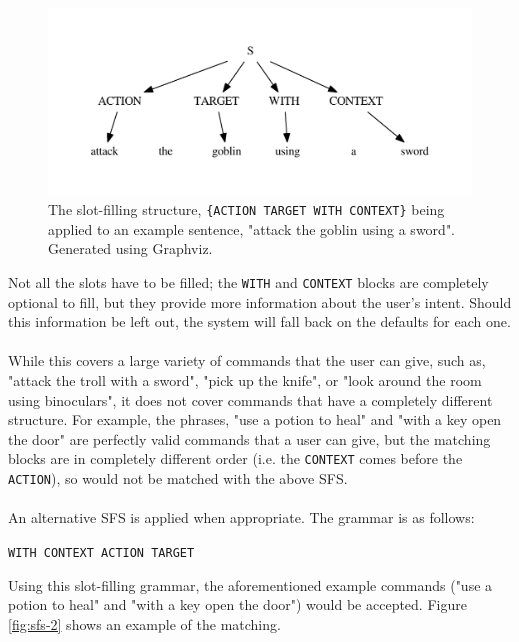 \documentclass[12pt]{article}
\begin{document}
\begin{center}
\begin{figure}[H]
\begin{center}
  \includegraphics[width=\linewidth]{sfs-1.pdf}
  \caption{The slot-filling structure, \texttt{\{ACTION TARGET WITH CONTEXT\}} being applied to an example sentence, "attack the goblin using a sword". Generated using Graphviz.}
  \label{fig:sfs-1}
  \end{center}
\end{figure}
\end{center}

Not all the slots have to be filled; the \texttt{WITH} and \texttt{CONTEXT} blocks are completely optional to fill, but they provide more information about the user's intent. Should this information be left out, the system will fall back on the defaults for each one.
\\
\\
While this covers a large variety of commands that the user can give, such as, "attack the troll with a sword", "pick up the knife", or "look around the room using binoculars", it does not cover commands that have a completely different structure. For example, the phrases, "use a potion to heal" and "with a key open the door" are perfectly valid commands that a user can give, but the matching blocks are in completely different order (i.e. the \texttt{CONTEXT} comes before the \texttt{ACTION}), so would not be matched with the above SFS.
\\
\\
An alternative SFS is applied when appropriate. The grammar is as follows:

\begin{center}
\texttt{WITH CONTEXT ACTION TARGET}
\end{center}

Using this slot-filling grammar, the aforementioned example commands ("use a potion to heal" and "with a key open the door") would be accepted. Figure \ref{fig:sfs-2} shows an example of the matching.
\end{document}
